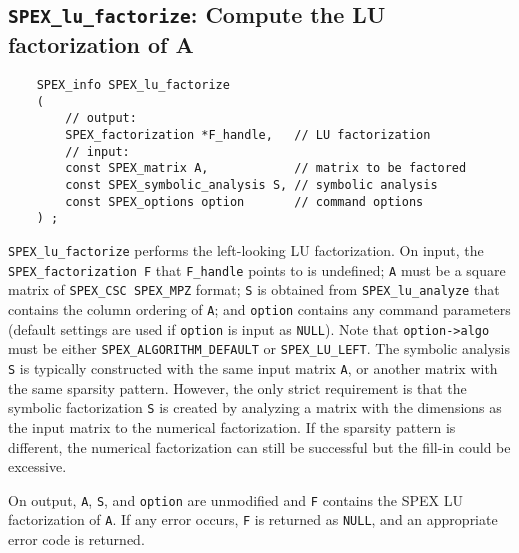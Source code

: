 \documentclass[12pt,oneside]{book}
\theoremstyle{definition}
\begin{document}
\subsection{\texttt{SPEX\_lu\_factorize}: Compute the LU factorization of A} \label{ss:spex_left_lu_factorize}
\begin{mdframed}[userdefinedwidth=\textwidth]
{\footnotesize
\begin{verbatim}
    SPEX_info SPEX_lu_factorize
    (
        // output:
        SPEX_factorization *F_handle,   // LU factorization
        // input:
        const SPEX_matrix A,            // matrix to be factored
        const SPEX_symbolic_analysis S, // symbolic analysis
        const SPEX_options option       // command options
    ) ;
\end{verbatim}
} \end{mdframed}

\verb|SPEX_lu_factorize| performs the left-looking LU factorization. On input, the \linebreak
\verb|SPEX_factorization F| that \verb|F_handle| points to is undefined; \verb|A| must be a square matrix of \verb|SPEX_CSC SPEX_MPZ| format; \verb|S| is obtained from \verb|SPEX_lu_analyze| that contains the column ordering of \verb|A|; and \verb|option| contains any command parameters (default settings are used if
\verb|option| is input as \verb|NULL|). Note that \verb|option->algo| must be either \verb|SPEX_ALGORITHM_DEFAULT| or \verb|SPEX_LU_LEFT|.  The symbolic analysis \verb'S' is typically
constructed with the same input matrix \verb'A', or
another matrix with the same sparsity pattern.  However, the
only strict requirement is that the symbolic factorization
\verb'S' is created by analyzing a matrix with the dimensions as the input matrix to the numerical factorization.  If the
sparsity pattern is different, the numerical factorization can
still be successful but the fill-in could be excessive.

On output, \verb|A|, \verb|S|, and \verb|option| are unmodified and \verb|F|  contains the SPEX LU factorization of \verb|A|.
If any error occurs, \verb|F| is returned as \verb|NULL|, and an appropriate error code is returned.
\end{document}
